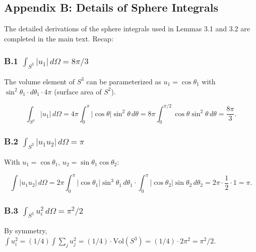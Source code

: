 \documentclass[
]{article}
\begin{document}
\subsection{Appendix B: Details of Sphere
Integrals}\label{appendix-b-details-of-sphere-integrals}

The detailed derivations of the sphere integrals used in Lemmas 3.1 and
3.2 are completed in the main text. Recap:

\subsubsection{\texorpdfstring{B.1
\(\int_{S^3} |u_1| \, d\Omega = 8\pi/3\)}{B.1 \textbackslash int\_\{S\^{}3\} \textbar u\_1\textbar{} \textbackslash, d\textbackslash Omega = 8\textbackslash pi/3}}\label{b.1-int_s3-u_1-domega-8pi3}

The volume element of \(S^3\) can be parameterized as
\(u_1 = \cos\theta_1\) with
\(\sin^2\theta_1 \cdot d\theta_1 \cdot 4\pi\) (surface area of \(S^2\)).

\[\int_{S^3} |u_1| \, d\Omega = 4\pi \int_0^\pi |\cos\theta| \sin^2\theta \, d\theta = 8\pi \int_0^{\pi/2} \cos\theta \sin^2\theta \, d\theta = \frac{8\pi}{3}.\]

\subsubsection{\texorpdfstring{B.2
\(\int_{S^3} |u_1 u_2| \, d\Omega = \pi\)}{B.2 \textbackslash int\_\{S\^{}3\} \textbar u\_1 u\_2\textbar{} \textbackslash, d\textbackslash Omega = \textbackslash pi}}\label{b.2-int_s3-u_1-u_2-domega-pi}

With \(u_1 = \cos\theta_1\), \(u_2 = \sin\theta_1 \cos\theta_2\):

\[\int |u_1 u_2| \, d\Omega = 2\pi \int_0^\pi |\cos\theta_1| \sin^3\theta_1 \, d\theta_1 \cdot \int_0^\pi |\cos\theta_2| \sin\theta_2 \, d\theta_2 = 2\pi \cdot \frac{1}{2} \cdot 1 = \pi.\]

\subsubsection{\texorpdfstring{B.3
\(\int_{S^3} u_i^2 \, d\Omega = \pi^2/2\)}{B.3 \textbackslash int\_\{S\^{}3\} u\_i\^{}2 \textbackslash, d\textbackslash Omega = \textbackslash pi\^{}2/2}}\label{b.3-int_s3-u_i2-domega-pi22}

By symmetry,
\(\int u_i^2 = (1/4) \int \sum_j u_j^2 = (1/4) \cdot \text{Vol}(S^3) = (1/4) \cdot 2\pi^2 = \pi^2/2\).
\end{document}
